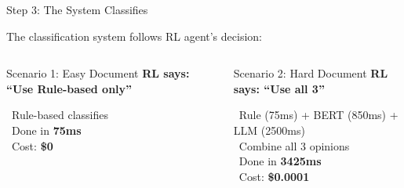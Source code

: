 \documentclass[aspectratio=169]{beamer}
\begin{document}
\begin{frame}{Step 3: The System Classifies \faFileAlt}
\begin{block}{The classification system follows RL agent's decision:}
\end{block}

\vspace{0.3cm}

\begin{columns}[T]
\begin{alertblock}{Scenario 1: Easy Document}
\textbf{RL says: ``Use Rule-based only''}

\vspace{0.2cm}
\faArrowRight\ Rule-based classifies \\
\faArrowRight\ Done in \textbf{75ms} \\
\faArrowRight\ Cost: \textbf{\$0}
\end{alertblock}

\begin{exampleblock}{Scenario 2: Hard Document}
\textbf{RL says: ``Use all 3''}

\vspace{0.2cm}
\faArrowRight\ Rule (75ms) + BERT (850ms) + LLM (2500ms) \\
\faArrowRight\ Combine all 3 opinions \\
\faArrowRight\ Done in \textbf{3425ms} \\
\faArrowRight\ Cost: \textbf{\$0.0001}
\end{exampleblock}
\end{columns}

\vspace{0.5cm}

\begin{center}
\end{center}
\end{frame}
\end{document}
